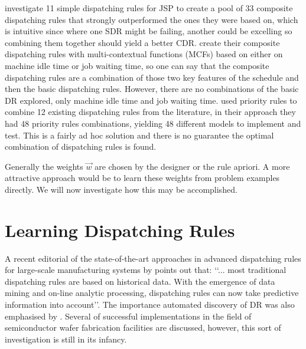 \documentclass[smallextended]{svjour3}
\begin{document}
\citet{Lu13} investigate 11 simple dispatching rules for JSP to create a pool 
of 33 composite dispatching rules that strongly outperformed the ones they were 
based on, which is intuitive since where one SDR might be failing, another 
could be excelling so combining them together should yield a better CDR. 
\citet{Lu13} create their composite dispatching rules with multi-contextual 
functions (MCFs) based on either on machine idle time or job waiting time, so 
one can say that the composite dispatching rules are a combination of those
two key features of the schedule and then the basic dispatching rules. However, 
there are no combinations of the basic DR explored, only machine idle time and 
job waiting time.  \citet{Yu13} used priority rules to combine 12 existing 
dispatching rules from the literature, in their approach they had 48 priority 
rules combinations, yielding 48 different models to implement and test. This is 
a fairly ad hoc solution and there is no guarantee the optimal combination of
dispatching rules is found.

Generally the weights $\vec{w}$ are chosen by the designer or the rule 
apriori.  A more attractive approach would be to learn these weights from 
problem examples directly. We will now investigate how this may be accomplished.

\section{Learning Dispatching Rules}\label{ch:learningmodels}
A recent editorial of the state-of-the-art approaches in advanced dispatching 
rules for large-scale manufacturing systems by \citet{Chen13} points out that:
\lq\lq ... most traditional dispatching rules are based on historical data. 
With the emergence of data mining and on-line analytic processing, dispatching 
rules can now take predictive information into account\rq\rq. The importance 
automated discovery of DR was also emphasised by \cite{Monch13}. 
Several of successful implementations in the field of semiconductor wafer 
fabrication facilities are discussed, however, this sort of investigation is 
still in its infancy.

\end{document}
